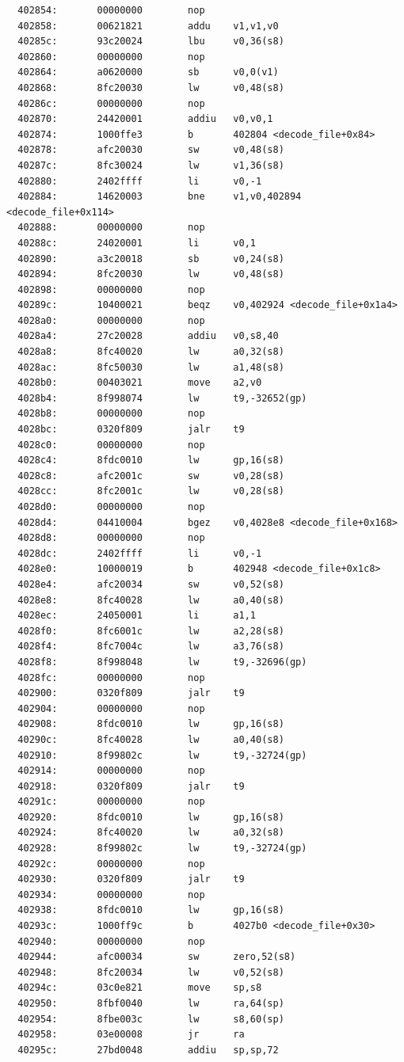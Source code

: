 \documentclass[11pt]{article}
\begin{document}
\begin{verbatim}
  402854:       00000000        nop
  402858:       00621821        addu    v1,v1,v0
  40285c:       93c20024        lbu     v0,36(s8)
  402860:       00000000        nop
  402864:       a0620000        sb      v0,0(v1)
  402868:       8fc20030        lw      v0,48(s8)
  40286c:       00000000        nop
  402870:       24420001        addiu   v0,v0,1
  402874:       1000ffe3        b       402804 <decode_file+0x84>
  402878:       afc20030        sw      v0,48(s8)
  40287c:       8fc30024        lw      v1,36(s8)
  402880:       2402ffff        li      v0,-1
  402884:       14620003        bne     v1,v0,402894 <decode_file+0x114>
  402888:       00000000        nop
  40288c:       24020001        li      v0,1
  402890:       a3c20018        sb      v0,24(s8)
  402894:       8fc20030        lw      v0,48(s8)
  402898:       00000000        nop
  40289c:       10400021        beqz    v0,402924 <decode_file+0x1a4>
  4028a0:       00000000        nop
  4028a4:       27c20028        addiu   v0,s8,40
  4028a8:       8fc40020        lw      a0,32(s8)
  4028ac:       8fc50030        lw      a1,48(s8)
  4028b0:       00403021        move    a2,v0
  4028b4:       8f998074        lw      t9,-32652(gp)
  4028b8:       00000000        nop
  4028bc:       0320f809        jalr    t9
  4028c0:       00000000        nop
  4028c4:       8fdc0010        lw      gp,16(s8)
  4028c8:       afc2001c        sw      v0,28(s8)
  4028cc:       8fc2001c        lw      v0,28(s8)
  4028d0:       00000000        nop
  4028d4:       04410004        bgez    v0,4028e8 <decode_file+0x168>
  4028d8:       00000000        nop
  4028dc:       2402ffff        li      v0,-1
  4028e0:       10000019        b       402948 <decode_file+0x1c8>
  4028e4:       afc20034        sw      v0,52(s8)
  4028e8:       8fc40028        lw      a0,40(s8)
  4028ec:       24050001        li      a1,1
  4028f0:       8fc6001c        lw      a2,28(s8)
  4028f4:       8fc7004c        lw      a3,76(s8)
  4028f8:       8f998048        lw      t9,-32696(gp)
  4028fc:       00000000        nop
  402900:       0320f809        jalr    t9
  402904:       00000000        nop
  402908:       8fdc0010        lw      gp,16(s8)
  40290c:       8fc40028        lw      a0,40(s8)
  402910:       8f99802c        lw      t9,-32724(gp)
  402914:       00000000        nop
  402918:       0320f809        jalr    t9
  40291c:       00000000        nop
  402920:       8fdc0010        lw      gp,16(s8)
  402924:       8fc40020        lw      a0,32(s8)
  402928:       8f99802c        lw      t9,-32724(gp)
  40292c:       00000000        nop
  402930:       0320f809        jalr    t9
  402934:       00000000        nop
  402938:       8fdc0010        lw      gp,16(s8)
  40293c:       1000ff9c        b       4027b0 <decode_file+0x30>
  402940:       00000000        nop
  402944:       afc00034        sw      zero,52(s8)
  402948:       8fc20034        lw      v0,52(s8)
  40294c:       03c0e821        move    sp,s8
  402950:       8fbf0040        lw      ra,64(sp)
  402954:       8fbe003c        lw      s8,60(sp)
  402958:       03e00008        jr      ra
  40295c:       27bd0048        addiu   sp,sp,72


\end{verbatim}
\end{document}
